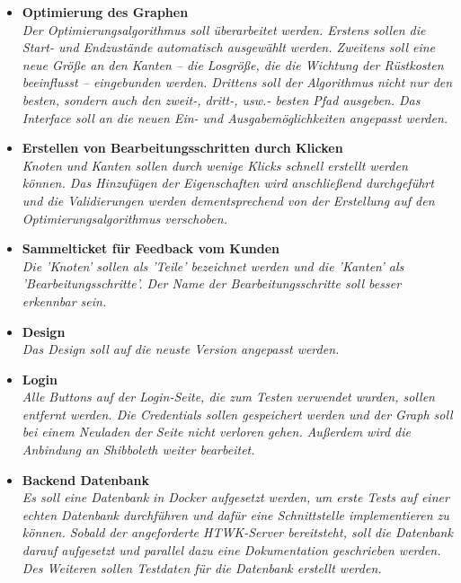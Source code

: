 \begin{itemize}
  \item \textbf{ Optimierung des Graphen }
        \\\textit{
          Der Optimierungsalgorithmus soll überarbeitet werden. Erstens sollen die Start- und Endzustände automatisch ausgewählt werden. Zweitens soll eine neue Größe an den Kanten -- die Losgröße, die die Wichtung der Rüstkosten beeinflusst -- eingebunden werden. Drittens soll der Algorithmus nicht nur den besten, sondern auch den zweit-, dritt-, usw.- besten Pfad ausgeben. Das Interface soll an die neuen Ein- und Ausgabemöglichkeiten angepasst werden.}
  \item \textbf{ Erstellen von Bearbeitungsschritten durch Klicken }
        \\\textit{
          Knoten und Kanten sollen durch wenige Klicks schnell erstellt werden können. Das Hinzufügen der Eigenschaften wird anschließend durchgeführt und die Validierungen werden dementsprechend von der Erstellung auf den Optimierungsalgorithmus verschoben.}
  \item \textbf{ Sammelticket für Feedback vom Kunden }
        \\\textit{
          Die 'Knoten' sollen als 'Teile' bezeichnet werden und die 'Kanten' als 'Bearbeitungsschritte'. Der Name der Bearbeitungsschritte soll besser erkennbar sein.}
  \item \textbf{ Design }
        \\\textit{
          Das Design soll auf die neuste Version angepasst werden.}
  \item \textbf{ Login }
        \\\textit{
          Alle Buttons auf der Login-Seite, die zum Testen verwendet wurden, sollen entfernt werden. Die Credentials sollen gespeichert werden und der Graph soll bei einem Neuladen der Seite nicht verloren gehen. Außerdem wird die Anbindung an Shibboleth weiter bearbeitet.}
  \item \textbf{ Backend Datenbank }
        \\\textit{
          Es soll eine Datenbank in Docker aufgesetzt werden, um erste Tests auf einer echten Datenbank durchführen und dafür eine Schnittstelle implementieren zu können. Sobald der angeforderte HTWK-Server bereitsteht, soll die Datenbank darauf aufgesetzt und parallel dazu eine Dokumentation geschrieben werden. Des Weiteren sollen Testdaten für die Datenbank erstellt werden.}

\end{itemize}


